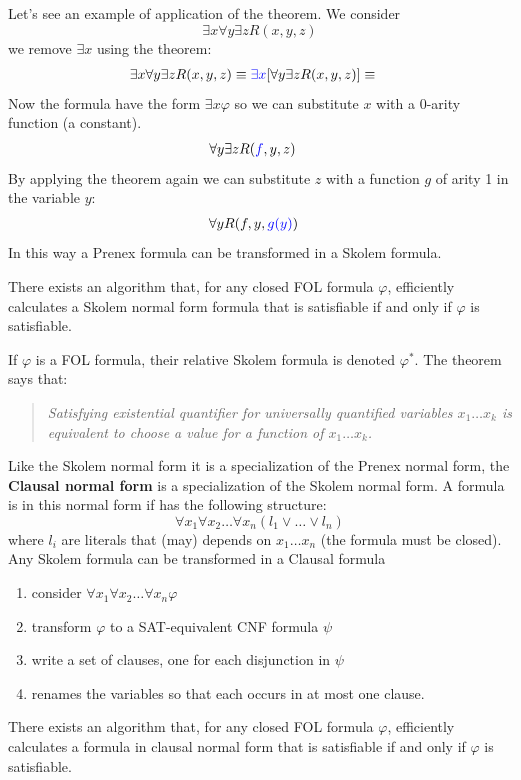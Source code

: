 \documentclass[10pt, letterpaper]{report}
\begin{document}
Let's see an example of application of the theorem. We consider 
$$ \exists x\forall y \exists z R(x,y,z)$$
we remove $\exists x$ using the theorem:\begin{align*}
     &\exists x\forall y \exists z R(x,y,z)\equiv  \color{blue}\exists x\color{black}[\forall y \exists z R(x,y,z)]\equiv
\end{align*}
Now the formula have the form $\exists x\varphi$ so we can substitute $x$ with a $0$-arity function (a constant).
\begin{align*}
      &\forall y \exists z R(\color{blue}f\color{black},y,z)
\end{align*}
By applying the theorem again we can substitute $z$ with a function $g$ of arity 1 in the variable $y$:
\begin{align*}
      &\forall y R(f,y,\color{blue}g(y)\color{black})
\end{align*}
In this way a Prenex formula can be transformed in a Skolem formula.
\begin{theorem}
    There exists an algorithm that, for any closed FOL formula $\varphi$, efficiently calculates a Skolem normal form formula that is satisfiable if and only if $\varphi$ is satisfiable.
\end{theorem}
If $\varphi$ is a FOL formula, their relative Skolem formula is denoted $\varphi^*$. The theorem says that:\begin{quotation}
    \textit{Satisfying existential quantifier for universally quantified variables $x_1\dots x_k$ is equivalent to choose a value for a function of $x_1\dots x_k$.}
\end{quotation}
Like the Skolem normal form it is a specialization of the Prenex normal form, the \textbf{Clausal normal form} is a specialization of the Skolem normal form. A formula is in this normal form if has the following structure:\begin{equation}
    \forall x_1\forall x_2\dots \forall x_n(l_1\lor \dots \lor l_n)
\end{equation}
where $l_i$ are literals that (may) depends on $x_1\dots x_n$ (the formula must be closed). Any Skolem formula can be transformed in a Clausal formula\begin{enumerate}
    \item consider $ \forall x_1\forall x_2\dots \forall x_n \varphi$
    \item transform $\varphi$ to a SAT-equivalent CNF formula $\psi$
    \item write a set of clauses, one for each disjunction in $\psi$
    \item renames the variables so that each occurs in at most one clause.
\end{enumerate} 
\begin{theorem}
    There exists an algorithm that, for any closed FOL formula $\varphi$,
 efficiently calculates a formula in clausal normal form that is satisfiable if and only if
 $\varphi$ is satisfiable.
\end{theorem}
\end{document}
